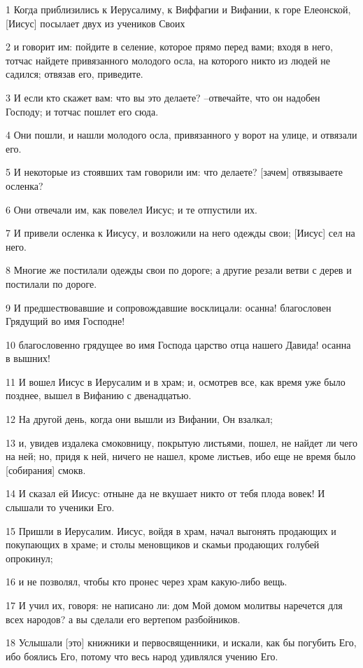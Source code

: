 \par 1 Когда приблизились к Иерусалиму, к Виффагии и Вифании, к горе Елеонской, [Иисус] посылает двух из учеников Своих
\par 2 и говорит им: пойдите в селение, которое прямо перед вами; входя в него, тотчас найдете привязанного молодого осла, на которого никто из людей не садился; отвязав его, приведите.
\par 3 И если кто скажет вам: что вы это делаете? --отвечайте, что он надобен Господу; и тотчас пошлет его сюда.
\par 4 Они пошли, и нашли молодого осла, привязанного у ворот на улице, и отвязали его.
\par 5 И некоторые из стоявших там говорили им: что делаете? [зачем] отвязываете осленка?
\par 6 Они отвечали им, как повелел Иисус; и те отпустили их.
\par 7 И привели осленка к Иисусу, и возложили на него одежды свои; [Иисус] сел на него.
\par 8 Многие же постилали одежды свои по дороге; а другие резали ветви с дерев и постилали по дороге.
\par 9 И предшествовавшие и сопровождавшие восклицали: осанна! благословен Грядущий во имя Господне!
\par 10 благословенно грядущее во имя Господа царство отца нашего Давида! осанна в вышних!
\par 11 И вошел Иисус в Иерусалим и в храм; и, осмотрев все, как время уже было позднее, вышел в Вифанию с двенадцатью.
\par 12 На другой день, когда они вышли из Вифании, Он взалкал;
\par 13 и, увидев издалека смоковницу, покрытую листьями, пошел, не найдет ли чего на ней; но, придя к ней, ничего не нашел, кроме листьев, ибо еще не время было [собирания] смокв.
\par 14 И сказал ей Иисус: отныне да не вкушает никто от тебя плода вовек! И слышали то ученики Его.
\par 15 Пришли в Иерусалим. Иисус, войдя в храм, начал выгонять продающих и покупающих в храме; и столы меновщиков и скамьи продающих голубей опрокинул;
\par 16 и не позволял, чтобы кто пронес через храм какую-либо вещь.
\par 17 И учил их, говоря: не написано ли: дом Мой домом молитвы наречется для всех народов? а вы сделали его вертепом разбойников.
\par 18 Услышали [это] книжники и первосвященники, и искали, как бы погубить Его, ибо боялись Его, потому что весь народ удивлялся учению Его.
